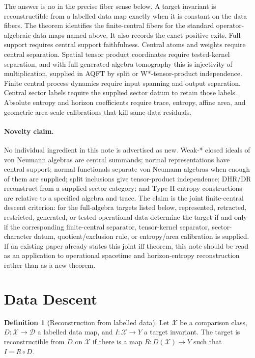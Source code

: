 \documentclass[12pt]{article}
\theoremstyle{definition}
\newtheorem{definition}{Definition}
\theoremstyle{remark}
\newcommand{\D}{\mathcal D}
\begin{document}
The answer is no in the precise fiber sense below.  A target invariant is
reconstructible from a labelled data map exactly when it is constant on the
data fibers.  The theorem identifies the finite-central fibers for the standard
operator-algebraic data maps named above.  It also records the exact positive
exits.  Full support requires central support faithfulness.  Central atoms and
weights require central separation.  Spatial tensor product coordinates require
tested-kernel separation, and with full generated-algebra tomography this is
injectivity of multiplication, supplied in AQFT by split or
W*-tensor-product independence.  Finite central process dynamics require
input spanning and output separation.  Central sector labels require the
supplied sector datum to retain those labels.  Absolute entropy and horizon
coefficients require trace, entropy, affine area, and geometric area-scale
calibrations that kill same-data residuals.

\paragraph{Novelty claim.}
No individual ingredient in this note is advertised as new.  Weak-* closed
ideals of von Neumann algebras are central summands; normal representations
have central support; normal functionals separate von Neumann algebras when
enough of them are supplied; split inclusions give tensor-product
independence; DHR/DR reconstruct from a supplied sector category; and Type II
entropy constructions are relative to a specified algebra and trace.  The
claim is the joint finite-central descent criterion: for the full-algebra
targets listed below, represented, retracted, restricted, generated, or tested
operational data determine the target if and only if the corresponding
finite-central separator, tensor-kernel separator, sector-character datum,
quotient/exclusion rule, or entropy/area calibration is supplied.  If an
existing paper already states this joint iff theorem, this note should be read
as an application to operational spacetime and horizon-entropy reconstruction
rather than as a new theorem.

\section{Data Descent}

\begin{definition}[Reconstruction from labelled data]
Let \(\mathcal X\) be a comparison class, \(D:\mathcal X\to\D\) a labelled data
map, and \(I:\mathcal X\to Y\) a target invariant.  The target is
reconstructible from \(D\) on \(\mathcal X\) if there is a map
\(R:D(\mathcal X)\to Y\) such that \(I=R\circ D\).
\end{definition}
\end{document}
